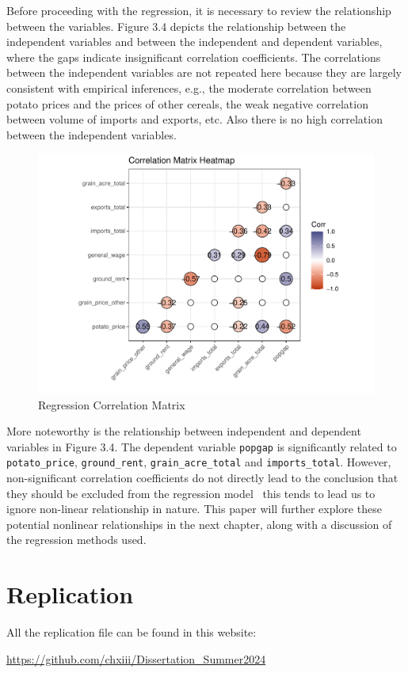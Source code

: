 Before proceeding with the regression, it is necessary to review the relationship between the variables. Figure 3.4 depicts the relationship between the independent variables and between the independent and dependent variables, where the gaps indicate insignificant correlation coefficients. The correlations between the independent variables are not repeated here because they are largely consistent with empirical inferences, e.g., the moderate correlation between potato prices and the prices of other cereals, the weak negative correlation between volume of imports and exports, etc. Also there is no high correlation between the independent variables.

\begin{figure}[htbp]
    \centering
    \caption{Regression Correlation Matrix}
    \includegraphics[width=.95\textwidth]{../03_outputs/corrmatrix.pdf}
\end{figure}

More noteworthy is the relationship between independent and dependent variables in Figure 3.4. The dependent variable \texttt{popgap} is significantly related  to \texttt{potato\_price}, \texttt{ground\_rent}, \texttt{grain\_acre\_total} and \texttt{imports\_total}. However, non-significant correlation coefficients do not directly lead to the conclusion that they should be excluded from the regression model \textemdash\ this tends to lead us to ignore non-linear relationship in nature. This paper will further explore these potential nonlinear relationships in the next chapter, along with a discussion of the regression methods used.

\section{Replication}

All the replication file can be found in this website:

\url{https://github.com/chxiii/Dissertation_Summer2024}

